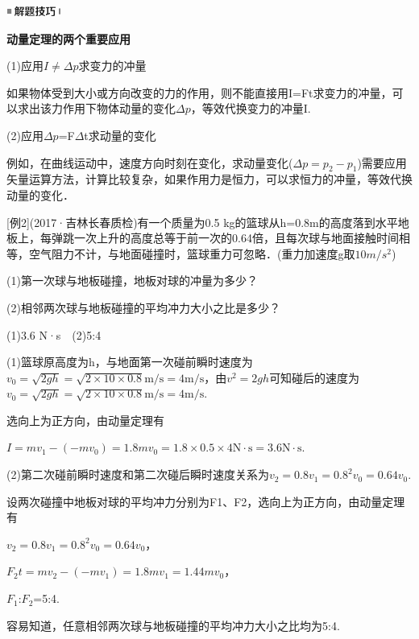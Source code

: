 \documentclass[cn,10.5pt,chinese,mac,chinesefont=founder]{elegantbook}
\begin{document}
\begin{center}\includegraphics[width=0.70764in,height=0.12292in]{media/image37.png}

\textbf{动量定理的两个重要应用}
\end{center}

(1)应用$I\neq \Delta p$求变力的冲量

如果物体受到大小或方向改变的力的作用，则不能直接用I=Ft求变力的冲量，可以求出该力作用下物体动量的变化$\Delta p$，等效代换变力的冲量I.

(2)应用$\Delta p$=F$\Delta$t求动量的变化

例如，在曲线运动中，速度方向时刻在变化，求动量变化($\Delta p=p_2-p_1$)需要应用矢量运算方法，计算比较复杂，如果作用力是恒力，可以求恒力的冲量，等效代换动量的变化．

{[}例2{]}(2017·吉林长春质检)有一个质量为0.5 kg的篮球从h=0.8m的高度落到水平地板上，每弹跳一次上升的高度总等于前一次的0.64倍，且每次球与地面接触时间相等，空气阻力不计，与地面碰撞时，篮球重力可忽略．(重力加速度g取$10m/s^2$)

(1)第一次球与地板碰撞，地板对球的冲量为多少？

(2)相邻两次球与地板碰撞的平均冲力大小之比是多少？

\begin{solution}
	(1)3.6 N·s　(2)5:4
	
	(1)篮球原高度为h，与地面第一次碰前瞬时速度为$v_{0}=\sqrt{2 g h}=\sqrt{2 \times 10 \times 0.8} \mathrm{m} / \mathrm{s}=4 \mathrm{m} / \mathrm{s}$，由$v^2=2gh$可知碰后的速度为$v_{0}=\sqrt{2 g h}=\sqrt{2 \times 10 \times 0.8} \mathrm{m} / \mathrm{s}=4 \mathrm{m} / \mathrm{s}$.

选向上为正方向，由动量定理有

$I=m v_{1}-\left(-m v_{0}\right)=1.8 m v_{0}=1.8 \times 0.5 \times 4 \mathrm{N} \cdot \mathrm{s}=3.6 \mathrm{N} \cdot \mathrm{s}$.

(2)第二次碰前瞬时速度和第二次碰后瞬时速度关系为$v_{2}=0.8 v_{1}=0.8^{2} v_{0}=0.64 v_{0}$.

设两次碰撞中地板对球的平均冲力分别为F1、F2，选向上为正方向，由动量定理有

$v_{2}=0.8 v_{1}=0.8^{2} v_{0}=0.64 v_{0}$，

$F_{2} t=m v_{2}-\left(-m v_{1}\right)=1.8 m v_{1}=1.44 m v_{0}$，

$F_1$:$F_2$=5:4.

容易知道，任意相邻两次球与地板碰撞的平均冲力大小之比均为5:4.
\end{solution}
\end{document}
